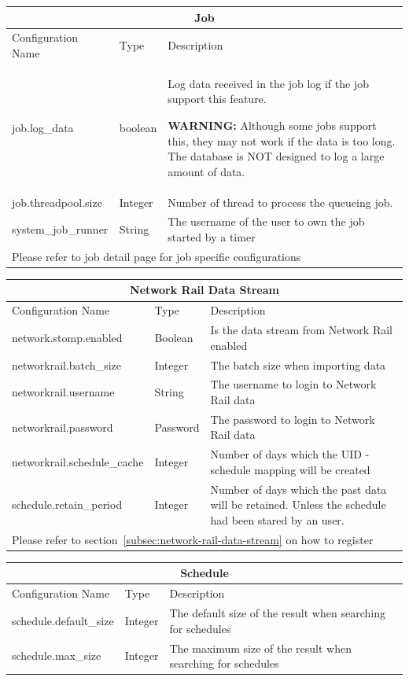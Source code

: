 \documentclass[12pt]{report}
\begin{document}
    \begin{longtable}{|p{}|p{}|p{}|}\hline
    \multicolumn{3}{|c|}{Job}\\\hline
    Configuration Name & Type & Description \\\hline\endhead
        job.log\_data & boolean & Log data received in the job log if the job support this feature.

        \textbf{WARNING:} Although some jobs support this, they may not work if the data is too long.
        The database is NOT designed to log a large amount of data.\\\hline
    job.threadpool.size & Integer & Number of thread to process the queueing job. \\\hline
    system\_job\_runner & String & The username of the user to own the job started by a timer \\\hline
    \multicolumn{3}{|l|}{Please refer to job detail page for job specific configurations}\\\hline
    \end{longtable}
    \begin{longtable}{|p{}|p{}|p{}|}\hline
    \multicolumn{3}{|c|}{Network Rail Data Stream}\\\hline
    Configuration Name & Type & Description \\\hline\endhead
    network.stomp.enabled & Boolean & Is the data stream from Network Rail enabled \\\hline
    networkrail.batch\_size & Integer & The batch size when importing data \\\hline
    networkrail.username & String & The username to login to Network Rail data \\\hline
    networkrail.password & Password & The password to login to Network Rail data \\\hline
    networkrail.schedule\_cache & Integer & Number of days which the UID - schedule mapping will be created \\\hline
    schedule.retain\_period & Integer & Number of days which the past data will be retained.
    Unless the schedule had been stared by an user.\\\hline
    \multicolumn{3}{|l|}{Please refer to section~\ref{subsec:network-rail-data-stream} on how to register}\\\hline
    \end{longtable}
    \begin{longtable}{|p{}|p{}|p{}|}\hline
    \multicolumn{3}{|c|}{Schedule}\\\hline
    Configuration Name & Type & Description \\\hline\endhead
    schedule.default\_size & Integer & The default size of the result when searching for schedules \\\hline
    schedule.max\_size & Integer & The maximum size of the result when searching for schedules \\\hline
    \end{longtable}
\end{document}
